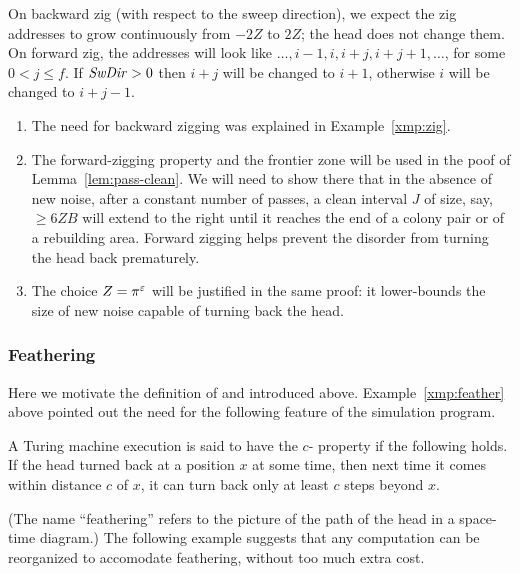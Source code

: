 \documentclass[11pt]{memoir}
\theoremstyle{definition} %
\renewcommand{\le}{\leq}
\renewcommand{\ge}{\geq}
\newcommand{\fld}[1]{\ensuremath{\textit{#1\/}}}
\def\B{B}
\renewcommand{\f}{f} %
\newcommand{\passno}{\pi}
\newcommand{\Z}{Z}
\newcommand{\SwDir}{\fld{SwDir}}
\begin{document}
On backward zig (with respect to the sweep direction), we expect the zig addresses to
grow continuously from \( -2\Z \) to \( 2\Z \); the head does not change them.
On forward zig, the addresses will look like \( \dots, i-1,i,i+j,i+j+1,\dots \), for some \( 0<j\le\f \).
If \( \SwDir>0 \) then \( i+j \) will be changed to \( i+1 \), otherwise
\( i \) will be changed to \( i+j-1 \).

\begin{remarks}\label{rem:zigging-choices}
  \begin{enumerate}
  \item The need for backward zigging was explained in Example~\ref{xmp:zig}.
  \item The forward-zigging property and the frontier zone
    will be used in the poof of Lemma~\ref{lem:pass-clean}.
    We will need to show there that
    in the absence of new noise, after a constant number of passes, a clean interval \( J \)
    of size, say, \( \ge 6\Z\B \) will extend to the right until it reaches
    the end of a colony pair or of a rebuilding area.
    Forward zigging helps prevent the disorder from turning the head back prematurely.
  \item The choice \( \Z=\passno^{\eps} \) will be justified in the same proof:
    it lower-bounds the size of new noise capable of turning back the head.
  \end{enumerate}
\end{remarks}

\subsubsection{Feathering}\label{sec:feathering}

Here we motivate the definition of  and  introduced above.
Example~\ref{xmp:feather} above pointed out the need for the
following feature of the simulation program.

\begin{definition}[Feathering]\label{def:feathering}
A Turing machine execution is said to have the \( c \)- property if the following holds.
If the head turned back at a position \( x \) at some time, then next time it comes within distance \( c \)
of \( x \), it can turn back only at least \( c \) steps beyond \( x \).
\end{definition}

(The name ``feathering'' refers to the picture of the path of the head in a space-time diagram.)
The following example suggests that any computation can be reorganized to accomodate feathering,
without too much extra cost.
\end{document}
